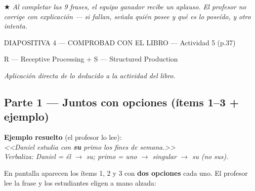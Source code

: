 \documentclass[a4paper,10pt]{article}
\newcommand{\pos}[1]{\textbf{\textcolor{purpura}{#1}}}
\begin{document}
\vspace{0.4cm}

\begin{gamebox}
$\bigstar$ \textit{Al completar las 9 frases, el equipo ganador recibe un aplauso. El profesor no corrige con explicaci\'on --- si fallan, se\~{n}ala qui\'en posee y qu\'e es lo pose\'ido, y otro intenta.}
\end{gamebox}

\newpage


\begin{diapoheader}{DIAPOSITIVA 4 --- COMPROBAD CON EL LIBRO --- Actividad 5 (p.37)}
\end{diapoheader}

\vspace{0.3cm}

\begin{marsfase}{R --- Receptive Processing + S --- Structured Production}
\end{marsfase}

\vspace{0.2cm}

\textit{Aplicaci\'on directa de lo deducido a la actividad del libro.}

\vspace{0.5cm}


\subsection*{\textcolor{purpura}{Parte 1 --- Juntos con opciones (\'items 1--3 + ejemplo)}}

\textbf{Ejemplo resuelto} (el profesor lo lee):\\[0.2cm]
\textit{<<Daniel estudia con \pos{su} primo los fines de semana.>>}\\
\textit{Verbaliza: Daniel = \'el $\rightarrow$ su; primo = uno $\rightarrow$ singular $\rightarrow$ su (no sus).}

\vspace{0.4cm}

En pantalla aparecen los \'items 1, 2 y 3 con \textbf{dos opciones} cada uno. El profesor lee la frase y los estudiantes eligen a mano alzada:

\vspace{0.3cm}
\end{document}

